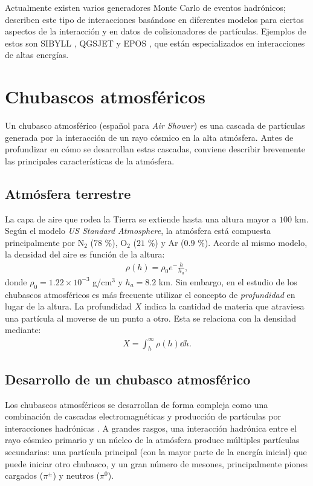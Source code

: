 	Actualmente existen varios generadores Monte Carlo de eventos hadrónicos; describen este tipo de interacciones basándose en diferentes modelos para ciertos aspectos de la interacción y en datos de colisionadores de partículas. Ejemplos de estos son SIBYLL \cite{Sibyll}, QGSJET \cite{qgsjet} y EPOS \cite{EPOS}, que están especializados en interacciones de altas energías. 
	

\section{Chubascos atmosféricos}
	Un chubasco atmosférico (español para \textit{Air Shower}) es una cascada de partículas generada por la interacción de un rayo cósmico en la alta atmósfera. Antes de profundizar en cómo se desarrollan estas cascadas, conviene describir brevemente las principales características de la atmósfera.
	
	\subsection{Atmósfera terrestre}
	La capa de aire que rodea la Tierra se extiende hasta una altura  mayor a $100$ km. Según el modelo \textit{US Standard Atmosphere}, la atmósfera está compuesta principalmente por N$_2$ ($78$ \%), O$_2$ ($21$ \%) y Ar ($0.9$ \%). Acorde al mismo modelo, la densidad del aire es función de la altura:
	\begin{align}
	\rho(h)=\rho_0 e^-\frac{h}{h_a},
	\end{align}
	donde $\rho_0 = 1.22\times 10^{-3}$ g/cm$^3$ y $h_a = 8.2$ km. Sin embargo, en el estudio de los chubascos atmosféricos es más frecuente utilizar el concepto de \textit{profundidad} en lugar de la altura. La profundidad $X$ indica la cantidad de materia que atraviesa una partícula al moverse de un punto a otro. Esta se relaciona con la densidad mediante:
	\begin{align}
	X = \int_h^{\infty} \rho (h) \dd h.
	\end{align}

	\subsection{Desarrollo de un chubasco atmosférico}	
	Los chubascos atmosféricos se desarrollan de forma compleja como una combinación de cascadas electromagnéticas y producción de partículas por interacciones hadrónicas \cite{Matthews2005}. A grandes rasgos, una interacción hadrónica entre el rayo cósmico primario y un núcleo de la atmósfera produce múltiples partículas secundarias: una partícula principal (con la mayor parte de la energía inicial) que puede iniciar otro chubasco, y un gran número de mesones, principalmente piones cargados ($\pi^{\pm}$) y neutros ($\pi^0$).\\

